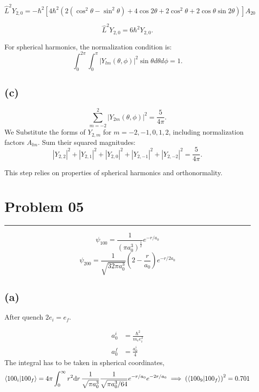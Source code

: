 \documentclass[letter, 10pts]{article}
\newcommand{\hb}{\hbar}
\begin{document}
\[
\hat{L}^2 Y_{2,0} = -\hbar^2 \left[4\hbar^2 \left(2(\cos^2\theta - \sin^2\theta) + 4\cos 2\theta + 2\cos^2\theta + 2\cos\theta\sin 2\theta\right)\right] A_{20}
\]


\[
\hat{L}^2 Y_{2,0} = 6\hbar^2 Y_{2,0}.
\]


For spherical harmonics, the normalization condition is:
\[
\int_0^{2\pi} \int_0^\pi |Y_{lm}(\theta, \phi)|^2 \sin\theta d\theta d\phi = 1.
\]


\subsection*{(c)} 
\[
\sum_{m=-2}^2 |Y_{2m}(\theta, \phi)|^2 = \frac{5}{4\pi}.
\]
We Substitute the forms of \( Y_{2,m} \) for \( m = -2, -1, 0, 1, 2 \), including normalization factors \( A_{lm} \).
Sum their squared magnitudes:
   \[
   |Y_{2,2}|^2 + |Y_{2,1}|^2 + |Y_{2,0}|^2 + |Y_{2,-1}|^2 + |Y_{2,-2}|^2 = \frac{5}{4\pi}.
   \]

This step relies on properties of spherical harmonics and orthonormality.







\newpage
\section*{Problem 05} 
\hrule 

\[
	\psi_{100} =
	\frac{1}{(\pi a^{3}_0 )^{\frac{1}{2}} } e^{ - r / a_0}
\] 
\[
	\psi_{200} = 
	\frac{1}{
\sqrt{32 \pi a_0^{3}} } 
\left(2 - \frac{r}{a_0}\right)
e^{ - r / 2 a_0}
\] 
\subsection*{(a)} 
After quench $2 e_i = e_f$. 

\begin{align*}
a_0^{i} &= \frac{\hb^2}{m_e e_i^2} \\
a_0^{f} &= \frac{a_0^{i}}{4} 
\end{align*}
The integral has to be taken in spherical coordinates, 
\begin{align*}
\braket{100_i | 100_f} &= 4 \pi \int_{0}^{\infty} r^2 \mathrm{d} r \, 
\frac{1}{\sqrt{\pi a_0^3} } \frac{1}{\sqrt{ \pi a_0^{3} / 64}}
e^{-r /a_0} e^{ - 2 r / a_0} 
\implies \left(\braket{100_9 | 100_f}\right)^2 = 0.701
\\ 
\end{align*}
\end{document}
